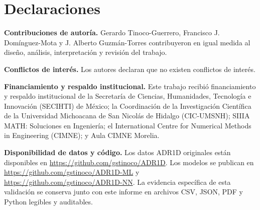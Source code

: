 \documentclass[11pt,a4paper]{article}
\begin{document}
\section*{Declaraciones}

\textbf{Contribuciones de autoría.} Gerardo Tinoco-Guerrero, Francisco J.
Domínguez-Mota y J. Alberto Guzmán-Torres contribuyeron en igual medida al
diseño, análisis, interpretación y revisión del trabajo.

\textbf{Conflictos de interés.} Los autores declaran que no existen conflictos
de interés.

\textbf{Financiamiento y respaldo institucional.} Este trabajo recibió
financiamiento y respaldo institucional de la Secretaría de Ciencias,
Humanidades, Tecnología e Innovación (SECIHTI) de México; la Coordinación de la
Investigación Científica de la Universidad Michoacana de San Nicolás de Hidalgo
(CIC-UMSNH); SIIIA MATH: Soluciones en Ingeniería; el International Centre for
Numerical Methods in Engineering (CIMNE); y Aula CIMNE Morelia.

\textbf{Disponibilidad de datos y código.} Los datos ADR1D originales están
disponibles en \url{https://github.com/gstinoco/ADR1D}. Los modelos se publican
en \url{https://github.com/gstinoco/ADR1D-ML} y
\url{https://github.com/gstinoco/ADR1D-NN}. La evidencia específica de esta
validación se conserva junto con este informe en archivos CSV, JSON, PDF y
Python legibles y auditables.
\end{document}
